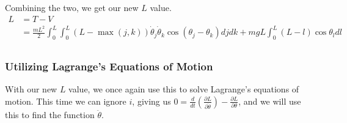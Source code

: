\documentclass{article}
\begin{document}
Combining the two, we get our new $L$ value.
\begin{align*}
	L &= T-V \\
	&= \frac{mL^2}{2}\int_0^L\int_0^L(L-\max(j,k))\dot\theta_j\dot\theta_k\cos(\theta_j-\theta_k)djdk + mgL\int_0^L(L-l)\cos\theta_ldl\\
\end{align*}
\subsubsection{Utilizing Lagrange's Equations of Motion}
With our new $L$ value, we once again use this to solve Lagrange's equations of motion. This time we can ignore $i$, giving us $0 = \frac{d}{dt}\left(\frac{\partial L}{\partial \dot \theta}\right) - \frac{\partial L}{\partial \theta}$, and we will use this to find the function $\ddot\theta$.
\end{document}
